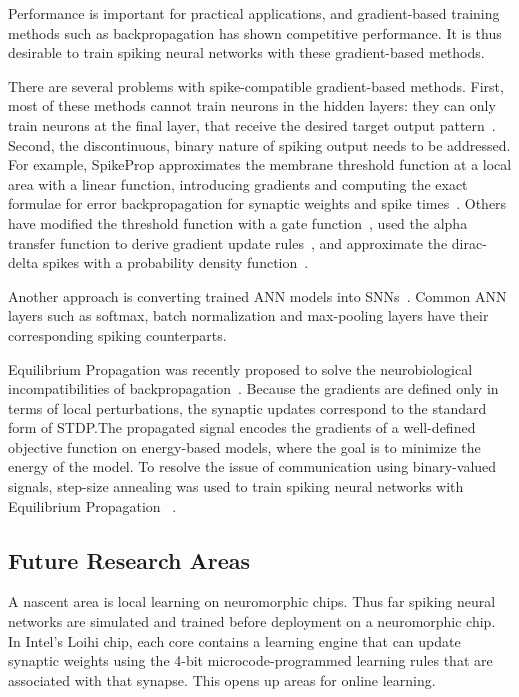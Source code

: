 \documentclass[fyp]{socreport}
\begin{document}
Performance is important for practical applications, and gradient-based training
methods such as backpropagation has shown competitive performance. It is thus
desirable to train spiking neural networks with these gradient-based methods.

There are several problems with spike-compatible gradient-based methods. First,
most of these methods cannot train neurons in the hidden layers: they can only
train neurons at the final layer, that receive the desired target output
pattern~\cite{urbanczik09_gradien_learn_rule_tempot,training_deep_snn_bpp_lee}.
Second, the discontinuous, binary nature of spiking output needs to be
addressed. For example, SpikeProp approximates the membrane threshold function
at a local area with a linear function, introducing gradients and computing the
exact formulae for error backpropagation for synaptic weights and spike
times~\cite{spikeprop}. Others have modified the threshold function with a gate
function~\cite{NIPS2018_7417}, used the alpha transfer function to derive
gradient update rules~\cite{comsa19_tempor_codin_spikin_neural_networ}, and
approximate the dirac-delta spikes with a probability density
function~\cite{NIPS2018_7415}.

Another approach is converting trained ANN models into
SNNs~\cite{rueckauer16_theor_tools_conver_analog_to}. Common ANN layers such as
softmax, batch normalization and max-pooling layers have their corresponding
spiking counterparts.

Equilibrium Propagation was recently proposed to solve the neurobiological
incompatibilities of backpropagation~\cite{10.3389/fncom.2017.00024}. Because
the gradients are defined only in terms of local perturbations, the synaptic
updates correspond to the standard form of STDP.\@ The propagated signal encodes
the gradients of a well-defined objective function on energy-based models, where
the goal is to minimize the energy of the model. To resolve the issue of
communication using binary-valued signals, step-size annealing was used to train
spiking neural networks with Equilibrium Propagation
~\cite{pmlr-v89-o-connor19a}.

\subsection{Future Research Areas\label{sec:future-rese-areas}}

A nascent area is local learning on neuromorphic chips. Thus far spiking neural
networks are simulated and trained before deployment on a neuromorphic chip. In
Intel's Loihi chip, each core contains a learning engine that can update
synaptic weights using the 4-bit microcode-programmed learning rules that are
associated with that synapse. This opens up areas for online learning.
\end{document}
